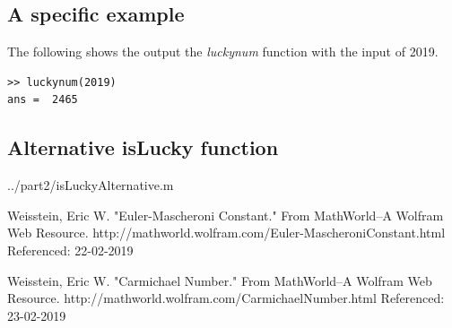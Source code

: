 \documentclass[10pt]{article}
\begin{document}
\subsection{A specific example}

The following shows the output the \emph{luckynum} function with the input of 2019.

\begin{verbatim}
>> luckynum(2019)
ans =  2465
\end{verbatim}
\begin{appendices}
\section{Alternative isLucky function}\label{islucky_appendix}

   {../part2/isLuckyAlternative.m}
  
\end{appendices}

\begin{thebibliography}{9}
Weisstein, Eric W. "Euler-Mascheroni Constant." From MathWorld--A Wolfram Web Resource. http://mathworld.wolfram.com/Euler-MascheroniConstant.html
Referenced: 22-02-2019

Weisstein, Eric W. "Carmichael Number." From MathWorld--A Wolfram Web Resource. http://mathworld.wolfram.com/CarmichaelNumber.html
Referenced: 23-02-2019

\end{thebibliography}
\end{document}
